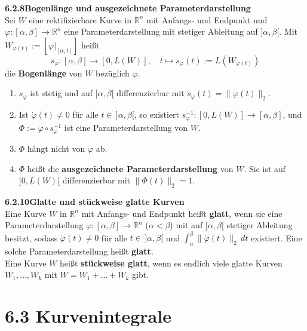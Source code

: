 \documentclass[a4paper,12pt]{article}
\newcommand{\gentry}[3]{%
  \noindent\textbf{#1\quad #2}\nopagebreak\\[0.2em]
  #3\par\smallskip
}
\begin{document}
\gentry{6.2.8}{Bogenlänge und ausgezeichnete Parameterdarstellung}{%
  Sei $W$ eine rektifizierbare Kurve in $\mathbb{R}^n$ mit Anfangs- und Endpunkt und
  $\varphi : [\alpha, \beta] \longrightarrow \mathbb{R}^n$ eine Parameterdarstellung
  mit stetiger Ableitung auf $]\alpha, \beta[$. Mit $W_{\varphi(t)} := [\varphi|_{[\alpha,t]}]$
  heißt
  \[
    s_\varphi : [\alpha, \beta] \longrightarrow [0, L(W)], \quad
    t \mapsto s_\varphi(t) := L(W_{\varphi(t)})
  \]
  die \textbf{Bogenlänge} von $W$ bezüglich $\varphi$.
  \begin{enumerate}[label=(\roman*),topsep=2pt,itemsep=1pt]
    \item $s_\varphi$ ist stetig und auf $]\alpha, \beta[$ differenzierbar mit
          $\dot{s}_\varphi(t) = \|\dot{\varphi}(t)\|_2$.
    \item Ist $\dot{\varphi}(t) \neq 0$ für alle $t \in\, ]\alpha, \beta[$, so existiert
          $s_\varphi^{-1} : [0, L(W)] \longrightarrow [\alpha, \beta]$, und
          $\Phi := \varphi \circ s_\varphi^{-1}$ ist eine Parameterdarstellung von $W$.
    \item $\Phi$ hängt nicht von $\varphi$ ab.
    \item $\Phi$ heißt die \textbf{ausgezeichnete Parameterdarstellung} von $W$. Sie ist
          auf $]0, L(W)[$ differenzierbar mit $\|\dot{\Phi}(t)\|_2 = 1$.
  \end{enumerate}
}

\gentry{6.2.10}{Glatte und stückweise glatte Kurven}{%
  Eine Kurve $W$ in $\mathbb{R}^n$ mit Anfangs- und Endpunkt heißt \textbf{glatt}, wenn sie
  eine Parameterdarstellung $\varphi : [\alpha, \beta] \longrightarrow \mathbb{R}^n$
  ($\alpha < \beta$) mit auf $]\alpha, \beta[$ stetiger Ableitung besitzt, sodass
  $\dot{\varphi}(t) \neq 0$ für alle $t \in\, ]\alpha, \beta[$ und
  $\int_\alpha^\beta \|\dot{\varphi}(t)\|_2\,dt$ existiert. Eine solche Parameterdarstellung
  heißt \textbf{glatt}.\\
  Eine Kurve $W$ heißt \textbf{stückweise glatt}, wenn es endlich viele glatte Kurven
  $W_1, \ldots, W_k$ mit $W = W_1 + \ldots + W_k$ gibt.
}

\section*{6.3 \quad Kurvenintegrale}
\end{document}
